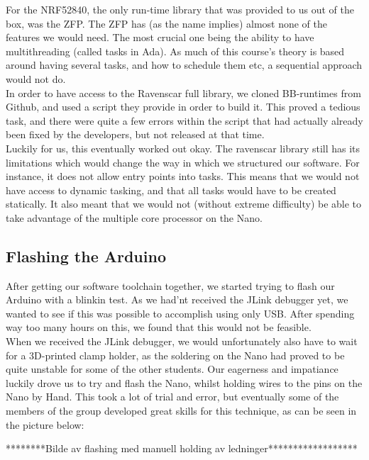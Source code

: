 \documentclass{article}
\begin{document}
For the NRF52840, the only run-time library that was provided to us out of the box, was the ZFP. The ZFP has (as the name implies) almost none of the features we would need. The most crucial one being the ability to have multithreading (called tasks in Ada). As much of this course's theory is based around having several tasks, and how to schedule them etc, a sequential approach would not do.\\ 

In order to have access to the Ravenscar full library, we cloned BB-runtimes from Github, and used a script they provide in order to build it. This proved a tedious task, and there were quite a few errors within the script that had actually already been fixed by the developers, but not released at that time.\\ 
Luckily for us, this eventually worked out okay. The ravenscar library still has its limitations which would change the way in which we structured our software. For instance, it does not allow entry points into tasks. This means that we would not have access to dynamic tasking, and that all tasks would have to be created statically. It also meant that we would not (without extreme difficulty) be able to take advantage of the multiple core processor on the Nano.\\

\subsection{Flashing the Arduino}

After getting our software toolchain together, we started trying to flash our Arduino with a blinkin test. As we had'nt received the JLink debugger yet, we wanted to see if this was possible to accomplish using only USB. After spending way too many hours on this, we found that this would not be feasible.\\ 

When we received the JLink debugger, we would unfortunately also have to wait for a 3D-printed clamp holder, as the soldering on the Nano had proved to be quite unstable for some of the other students. Our eagerness and impatiance luckily drove us to try and flash the Nano, whilst holding wires to the pins on the Nano by Hand. This took a lot of trial and error, but eventually some of the members of the group developed great skills for this technique, as can be seen in the picture below:

********Bilde av flashing med manuell holding av ledninger******************
\end{document}
